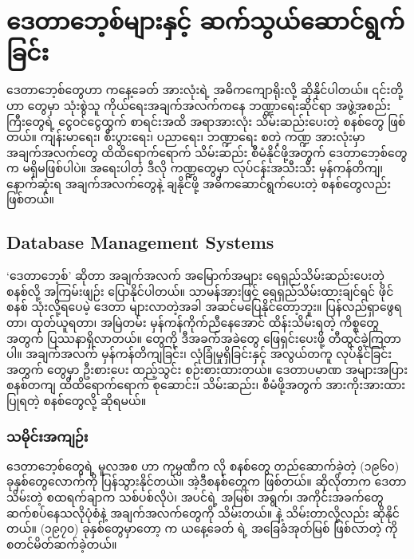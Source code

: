 \chapter{ဒေတာဘေ့စ်များနှင့် ဆက်သွယ်ဆောင်ရွက်ခြင်း}

ဒေတာဘေ့စ်တွေဟာ ကနေ့ခေတ်  အားလုံးရဲ့ အဓိကကျောရိုးလို့ ဆိုနိုင်ပါတယ်။ ၎င်းတို့ဟာ  တွေမှာ သုံးစွဲသူ ကိုယ်ရေးအချက်အလက်ကနေ ဘဏ္ဍာရေးဆိုင်ရာ အဖွဲ့အစည်းကြီးတွေရဲ့ ငွေဝင်ငွေထွက် စာရင်းအထိ အရာအားလုံး သိမ်းဆည်းပေးတဲ့ စနစ်တွေ ဖြစ်တယ်။ ကျန်းမာရေး၊ စီးပွားရေး၊ ပညာရေး၊ ဘဏ္ဍာရေး စတဲ့ ကဏ္ဍ အားလုံးမှာ အချက်အလက်တွေ ထိထိရောက်ရောက် သိမ်းဆည်း စီမံနိုင်ဖို့အတွက် ဒေတာဘေ့စ်တွေက မရှိမဖြစ်ပါပဲ။ အရေးပါတဲ့ ဒီလို ကဏ္ဍတွေမှာ လုပ်\allowbreak ငန်းအသီးသီး မှန်ကန်တိကျ၊ နောက်ဆုံးရ အချက်အလက်တွေနဲ့   ချနိုင်ဖို့ အဓိကဆောင်ရွက်ပေးတဲ့ စနစ်တွေလည်း ဖြစ်တယ်။


\section{Database Management Systems}
‘ဒေတာဘေ့စ်’ ဆိုတာ အချက်အလက် အမြောက်အများ ရေရှည်သိမ်းဆည်းပေးတဲ့ စနစ်လို့ အကြမ်းဖျဉ်း ပြောနိုင်ပါတယ်။ သာမန်အားဖြင့် ရေရှည်သိမ်းထားချင်ရင် ဖိုင်စနစ် သုံးလို့ရပေမဲ့ ဒေတာ များလာတဲ့အခါ အဆင်မပြေနိုင်တော့ဘူး။ ပြန်လည်ရှာဖွေရတာ၊ ထုတ်ယူရတာ၊ အမြဲတမ်း မှန်ကန်ကိုက်ညီနေအောင် ထိန်းသိမ်းရတဲ့ ကိစ္စတွေအတွက် ပြဿနာရှိလာတယ်။  တွေကို ဒီအခက်အခဲတွေ ဖြေရှင်းပေးဖို့  တီထွင်ခဲ့ကြတာပါ။ အချက်အလက် မှန်ကန်တိကျခြင်း၊ လုံခြုံမှုရှိခြင်းနှင့် အလွယ်တကူ  လုပ်နိုင်ခြင်းအတွက်  တွေမှာ ဦးစားပေး ထည့်သွင်း စဉ်းစားထားတယ်။ ဒေတာပမာဏ အများအပြား စနစ်တကျ ထိထိရောက်ရောက် စုဆောင်း၊ သိမ်းဆည်း၊ စီမံဖို့အတွက် အားကိုးအားထားပြုရတဲ့ စနစ်တွေလို့ ဆိုရမယ်။  

\subsection*{သမိုင်းအကျဉ်း}
ဒေတာဘေ့စ်တွေရဲ့ မူလအစ  ဟာ  ကုမ္ပဏီက  လို စနစ်တွေ တည်ဆောက်ခဲ့တဲ့ (၁၉၆၀) ခုနှစ်တွေလောက်ကို ပြန်သွားနိုင်တယ်။ အဲ့ဒီစနစ်တွေက  ဖြစ်တယ်။ ဆိုလိုတာက ဒေတာသိမ်းတဲ့ စထရက်ချာက သစ်ပစ်လိုပဲ၊ အပင်ရဲ့ အမြစ်၊ အရွက်၊ အကိုင်းအခက်တွေ ဆက်စပ်နေသလိုပုံစံနဲ့ အချက်အလက်တွေကို သိမ်းတယ်။  နဲ့ သိမ်းတာလို့လည်း ဆိုနိုင်တယ်။ (၁၉၇၀) ခုနှစ်တွေမှာတော့  က ယနေ့ခေတ်  ရဲ့ အခြေခံအုတ်မြစ် ဖြစ်လာတဲ့  ကို စတင်မိတ်ဆက်ခဲ့တယ်။ 


